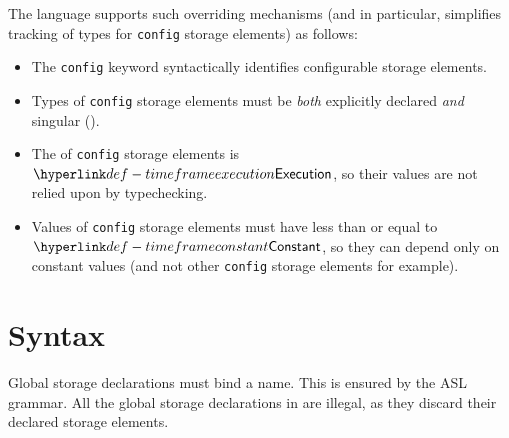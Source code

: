 The language supports such overriding mechanisms (and in particular, simplifies tracking of types for \texttt{config} storage elements) as follows:
\begin{itemize}
  \item The \texttt{config} keyword syntactically identifies configurable storage elements.
  \item Types of \texttt{config} storage elements must be \emph{both} explicitly declared \emph{and} singular ().
  \item The \timeframeterm{} of \texttt{config} storage elements is $\timeframeexecution$, so their values are not relied upon by typechecking.
  \item Values of \texttt{config} storage elements must have \timeframeterm{} less than or equal to $\timeframeconstant$, so they can depend only on constant values (and not other \texttt{config} storage elements for example).
\end{itemize}

\section{Syntax\label{sec:GlobalStorageDeclarationsSyntax}}

Global storage declarations must bind a name.
This is ensured by the ASL grammar.
All the global storage declarations in  are illegal, as they discard their declared storage elements.

